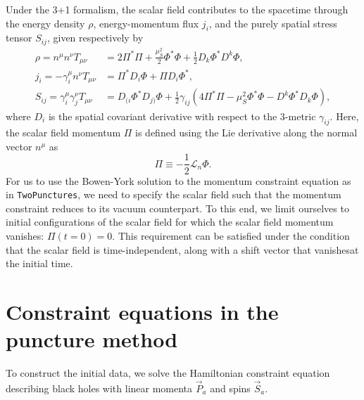 Under the 3+1 formalism,
the scalar field contributes to the spacetime through the energy density $\rho$,
energy-momentum flux $j_i$,
and the purely spatial stress tensor $S_{ij}$, given respectively by
\begin{align}
    \rho = n^\mu n^\nu T_{\mu\nu}
    &= 2 \Pi^* \Pi + \frac{\mu_S^2}{2} \Phi^* \Phi
    + \frac{1}{2} D_k\Phi^* D^k \Phi,
    \\
    j_i = -\gamma_i^\mu n^\nu T_{\mu\nu}
    &= \Pi^* D_i\Phi + \Pi D_i\Phi^*,
    \\
    S_{ij} = \gamma_i ^\mu \gamma_j^\nu T_{\mu\nu}
    &= D_{(i}\Phi^* D_{j)}\Phi
    + \frac{1}{2} \gamma_{ij}
    (4\Pi^* \Pi - \mu_S^2 \Phi^* \Phi - D^k\Phi^* D_k\Phi),
\end{align}
where $D_i$ is the spatial covariant derivative with respect to the 3-metric $\gamma_{ij}$.
Here, the scalar field momentum $\Pi$ is defined using the Lie derivative
along the normal vector $n^\mu$ as
\begin{equation}
    \Pi \equiv - \frac{1}{2} \mathcal{L}_n \Phi.
\end{equation}
For us to use the Bowen-York solution to the momentum constraint equation as in \texttt{TwoPunctures},
we need to specify the scalar field such that the momentum constraint reduces to its vacuum counterpart.
To this end, we limit ourselves to initial configurations of the scalar field for which the scalar field momentum vanishes: $\Pi(t=0)=0$.
This requirement can be satisfied under the condition that the scalar field is time-independent, along with a shift vector that vanishesat the initial time.

\section{Constraint equations in the puncture method}
To construct the initial data, we solve the Hamiltonian constraint equation
describing black holes with linear momenta $\vec{P}_a$ and spins $\vec{S}_a$.

